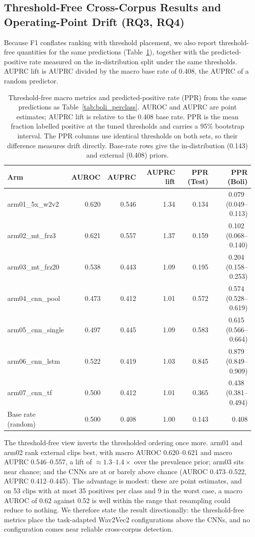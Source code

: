 \documentclass[a4paper,orivec]{llncs}
\newcommand{\ci}[1]{{\scriptsize\,(#1)}}
\begin{document}
\subsection{Threshold-Free Cross-Corpus Results and Operating-Point Drift (RQ3, RQ4)}
\label{sec:res-thresholdfree}
Because F1 conflates ranking with threshold placement, we also report
threshold-free quantities for the same predictions
(Table~\ref{tab:boli_drift}), together with the predicted-positive rate measured
on the in-distribution split under the same thresholds. AUPRC lift is AUPRC
divided by the macro base rate of 0.408, the AUPRC of a random predictor.

\begin{table}[!htbp]
\caption{Threshold-free macro metrics and predicted-positive rate (PPR) from the
same predictions as Table~\ref{tab:boli_perclass}. AUROC and AUPRC are point
estimates; AUPRC lift is relative to the 0.408 base rate. PPR is the mean
fraction labelled positive at the tuned thresholds and carries a 95\% bootstrap
interval. The PPR columns use identical thresholds on both sets, so their
difference measures drift directly. Base-rate rows give the in-distribution
(0.143) and external (0.408) priors.}
\label{tab:boli_drift}
\centering
\small
\renewcommand{\arraystretch}{0.9}
\setlength{\tabcolsep}{2pt}
\begin{tabular}{lrrrrr}
\hline
Arm & AUROC & AUPRC & AUPRC lift & PPR (Test) & PPR (Boli)\\
\hline
arm01\_5x\_w2v2 & 0.620 & 0.546 & 1.34 & 0.134 & 0.079 \ci{0.049--0.113}\\
arm02\_mt\_frz3 & 0.621 & 0.557 & 1.37 & 0.159 & 0.102 \ci{0.068--0.140}\\
arm03\_mt\_frz20 & 0.538 & 0.443 & 1.09 & 0.195 & 0.204 \ci{0.158--0.253}\\
arm04\_cnn\_pool & 0.473 & 0.412 & 1.01 & 0.572 & 0.574 \ci{0.528--0.619}\\
arm05\_cnn\_single & 0.497 & 0.445 & 1.09 & 0.583 & 0.615 \ci{0.566--0.664}\\
arm06\_cnn\_lstm & 0.522 & 0.419 & 1.03 & 0.845 & 0.879 \ci{0.849--0.909}\\
arm07\_cnn\_tf & 0.500 & 0.412 & 1.01 & 0.365 & 0.438 \ci{0.381--0.494}\\
\hline
Base rate (random) & 0.500 & 0.408 & 1.00 & 0.143 & 0.408\\
\hline
\end{tabular}
\end{table}

The threshold-free view inverts the thresholded ordering once more. arm01 and
arm02 rank external clips best, with macro AUROC 0.620--0.621 and macro AUPRC
0.546--0.557, a lift of ${\approx}1.3$--$1.4\times$ over the prevalence prior;
arm03 sits near chance; and the CNNs are at or barely above chance (AUROC
0.473--0.522, AUPRC 0.412--0.445). The advantage is modest: these are point
estimates, and on 53 clips with at most 35 positives per class and 9 in the worst
case, a macro AUROC of 0.62 against 0.52 is well within the range that resampling
could reduce to nothing. We therefore state the result directionally: the
threshold-free metrics place the task-adapted Wav2Vec2 configurations above the
CNNs, and no configuration comes near reliable cross-corpus detection.
\end{document}
